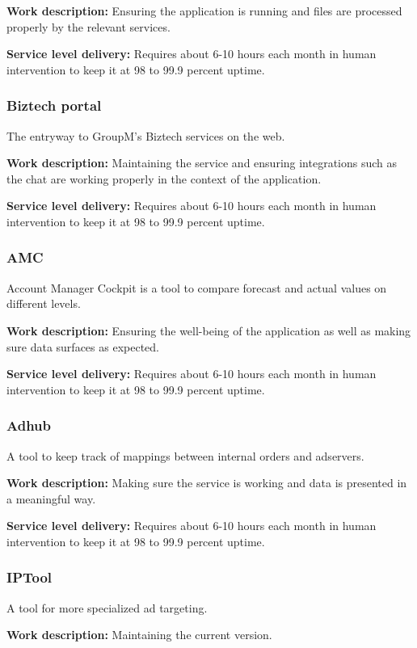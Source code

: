\textbf{Work description:} Ensuring the application is running and files are processed properly by the relevant services.

\textbf{Service level delivery:} Requires about 6-10 hours each month in human intervention to keep it at 98 to 99.9 percent uptime. 

\subsubsection{Biztech portal}
The entryway to GroupM's Biztech services on the web.

\textbf{Work description:} Maintaining the service and ensuring integrations such as the chat are working properly in the context of the application.

\textbf{Service level delivery:} Requires about 6-10 hours each month in human intervention to keep it at 98 to 99.9 percent uptime.

\subsubsection{AMC}
Account Manager Cockpit is a tool to compare forecast and actual values on different levels.

\textbf{Work description:} Ensuring the well-being of the application as well as making sure data surfaces as expected.

\textbf{Service level delivery:} Requires about 6-10 hours each month in human intervention to keep it at 98 to 99.9 percent uptime.

\subsubsection{Adhub}
A tool to keep track of mappings between internal orders and adservers.

\textbf{Work description:} Making sure the service is working and data is presented in a meaningful way.

\textbf{Service level delivery:} Requires about 6-10 hours each month in human intervention to keep it at 98 to 99.9 percent uptime.

\subsubsection{IPTool}
A tool for more specialized ad targeting.

\textbf{Work description:} Maintaining the current version.

